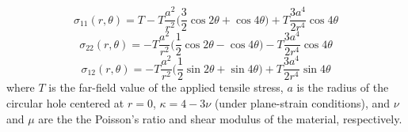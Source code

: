 \begin{equation}
  \sigma_{11} (r, \theta) = T - T \frac{a^2}{r^2} \bigg( \frac{3}{2} \cos 2 \theta + \cos 4 \theta \bigg) + T \frac{3a^4}{2r^4} \cos 4 \theta
\end{equation}
\begin{equation}
  \sigma_{22} (r, \theta) = - T \frac{a^2}{r^2} \bigg( \frac{1}{2} \cos 2 \theta - \cos 4 \theta \bigg) - T \frac{3a^4}{2r^4} \cos 4 \theta
\end{equation}
\begin{equation}
  \sigma_{12} (r, \theta) = - T \frac{a^2}{r^2} \bigg( \frac{1}{2} \sin 2 \theta + \sin 4 \theta \bigg) + T \frac{3a^4}{2r^4} \sin 4 \theta
\end{equation}
where $T$ is the far-field value of the applied tensile stress, $a$ is the radius of the circular hole centered at $r=0$, $\kappa = 4 - 3\nu$ (under plane-strain conditions), and $\nu$ and $\mu$ are the the Poisson's ratio and shear modulus of the material, respectively.

